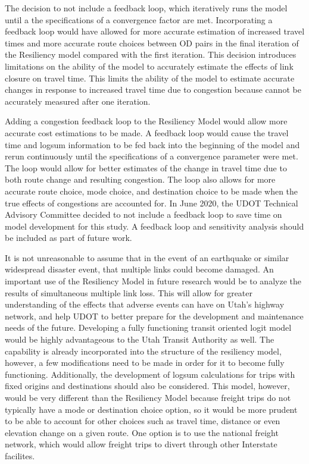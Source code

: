 The decision to not include a feedback loop, which iteratively runs the model
until a the specifications of a convergence factor are met. Incorporating a
feedback loop would have allowed for more accurate estimation of increased
travel times and more accurate route choices between OD pairs in the final
iteration of the Resiliency model compared with the first iteration.
This decision introduces limitations on the
ability of the model to accurately estimate the effects of link closure on
travel time. This limits the ability of the model to estimate accurate changes in
response to increased travel time due to congestion because cannot be
accurately measured after one iteration.

Adding a congestion feedback loop to the Resiliency Model would allow more
accurate cost estimations to be made. A feedback loop would cause the
travel time and logsum information to be fed back into the beginning of the
model and rerun continuously until the specifications of a convergence
parameter were met. The loop would allow for better estimates of the change
in travel time due to both route change and resulting congestion. The loop
also allows for more accurate route choice, mode choice, and destination
choice to be made when the true effects of congestions are accounted for.
In June 2020, the UDOT Technical Advisory Committee decided to not include a
feedback loop to save time
on model development for this study. A feedback loop and sensitivity analysis
should be included as part of future work.

It is not unreasonable to assume that in the event of an earthquake or
similar widespread disaster event, that multiple links could become
damaged. An important use of the Resiliency Model in future research would be
to analyze the results of simultaneous multiple link
loss. This will allow for
greater understanding of the effects that adverse events can have on Utah’s
highway network, and help UDOT to better prepare for the development and
maintenance needs of the future. Developing a fully functioning transit oriented logit model
would be highly advantageous to the Utah Transit Authority as well. The capability
is already incorporated into the structure of the resiliency model, however, a few modifications
need to be made in order for it to become fully functioning.
Additionally, the development of logsum calculations for trips with fixed
origins and destinations should also be considered. This model, however,
would be very different than the Resiliency Model because freight trips
do not typically have a mode or destination choice option, so it would be
more prudent to be able to account for other choices such as travel time,
distance or even elevation change on a given route. One option is to use the national
freight network, which would allow freight trips to divert through other Interstate
facilites.


